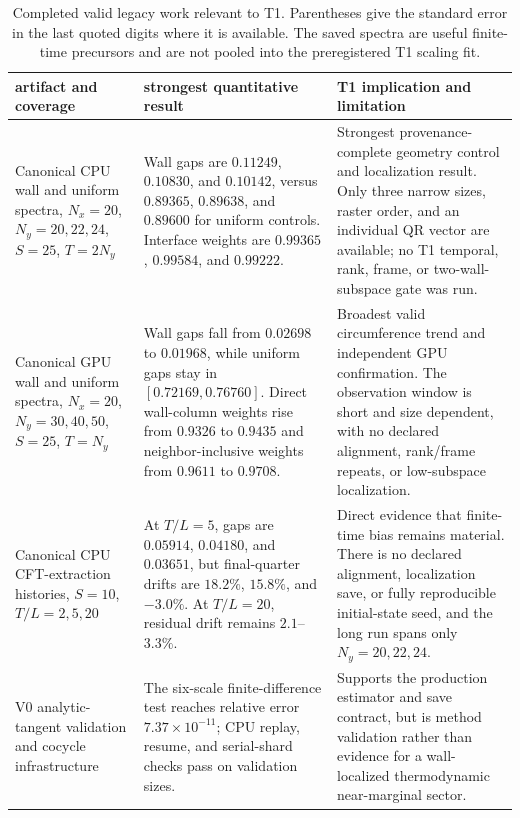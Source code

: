 \documentclass[aps,prx,twocolumn,floatfix,nofootinbib,superscriptaddress,longbibliography]{revtex4-2}
\newcommand{\campaignTableSetup}{%
  \footnotesize
  \setlength{\tabcolsep}{4pt}%
  \renewcommand{\arraystretch}{1.12}%
}
\begin{document}
\begin{table}[t]
\campaignTableSetup
\caption{Completed valid legacy work relevant to T1.  Parentheses give the standard error
in the last quoted digits where it is available.  The saved spectra are useful finite-time
precursors and are not pooled into the preregistered T1 scaling fit.}
\label{tab:T1-legacy}
\begin{tabularx}{\textwidth}{@{}L{0.75}L{1.10}L{1.15}@{}}
\toprule
artifact and coverage & strongest quantitative result & T1 implication and limitation \\
\midrule
Canonical CPU wall and uniform spectra, $N_x=20$, $N_y=20,22,24$, $S=25$,
$T=2N_y$
& Wall gaps are $0.11249$, $0.10830$, and $0.10142$, versus $0.89365$, $0.89638$,
and $0.89600$ for uniform controls.  Interface weights are $0.99365$, $0.99584$, and
$0.99222$.
& Strongest provenance-complete geometry control and localization result.  Only three
narrow sizes, raster order, and an individual QR vector are available; no T1 temporal,
rank, frame, or two-wall-subspace gate was run. \\
Canonical GPU wall and uniform spectra, $N_x=20$, $N_y=30,40,50$, $S=25$, $T=N_y$
& Wall gaps fall from $0.02698$ to $0.01968$, while uniform gaps stay in
$[0.72169,0.76760]$.  Direct wall-column weights rise from $0.9326$ to $0.9435$ and
neighbor-inclusive weights from $0.9611$ to $0.9708$.
& Broadest valid circumference trend and independent GPU confirmation.  The observation
window is short and size dependent, with no declared alignment, rank/frame repeats, or
low-subspace localization. \\
Canonical CPU CFT-extraction histories, $S=10$, $T/L=2,5,20$
& At $T/L=5$, gaps are $0.05914$, $0.04180$, and $0.03651$, but final-quarter drifts are
$18.2\%$, $15.8\%$, and $-3.0\%$.  At $T/L=20$, residual drift remains $2.1$--$3.3\%$.
& Direct evidence that finite-time bias remains material.  There is no declared alignment,
localization save, or fully reproducible initial-state seed, and the long run spans only
$N_y=20,22,24$. \\
V0 analytic-tangent validation and cocycle infrastructure
& The six-scale finite-difference test reaches relative error
$7.37\times10^{-11}$; CPU replay, resume, and serial-shard checks pass on validation
sizes.
& Supports the production estimator and save contract, but is method validation rather
than evidence for a wall-localized thermodynamic near-marginal sector. \\
\bottomrule
\end{tabularx}
\end{table}
\end{document}
